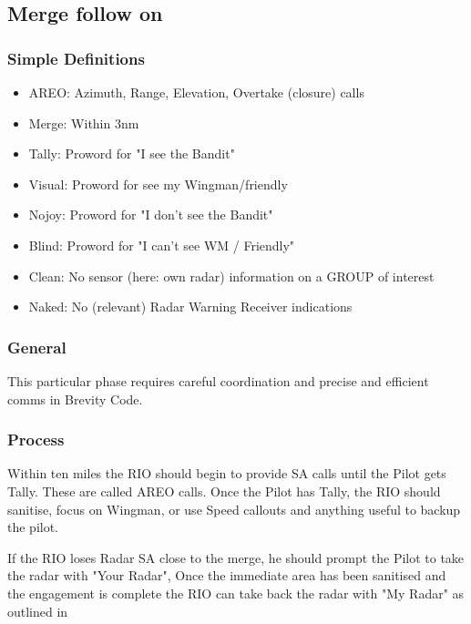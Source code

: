 \subsection{Merge follow on}

\subsubsection*{Simple Definitions}

\begin{itemize}

  \item AREO: Azimuth, Range, Elevation, Overtake (closure) calls
  \item Merge: Within 3nm
  \item Tally: Proword for "I see the Bandit"
  \item Visual: Proword for see my Wingman/friendly
  \item Nojoy: Proword for "I don't see the Bandit"
  \item Blind: Proword for "I can't see WM / Friendly"
  \item Clean: No sensor (here: own radar) information on a GROUP of interest
  \item Naked: No (relevant) Radar Warning Receiver indications
\end{itemize}

\subsubsection*{General}

This particular phase requires careful coordination and precise and efficient
comms in Brevity Code.

\subsubsection*{Process}

Within ten miles the RIO should begin to provide SA calls until the Pilot gets
Tally. These are called AREO calls. Once the Pilot has Tally, the RIO should
sanitise, focus on Wingman, or use Speed callouts and anything useful to backup
the pilot.

If the RIO loses Radar SA close to the merge, he should prompt the Pilot to
take the radar with "Your Radar", Once the immediate area has been sanitised
and the engagement is complete the RIO can take back the radar with "My Radar"
as outlined in 

